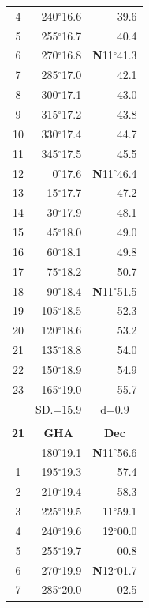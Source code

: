 \documentclass[10pt, a4paper]{report}
\begin{document}
\begin{scriptsize}
\begin{tabular*}{0.2\textwidth}[t]{@{\extracolsep{\fill}}|c|rr|}
4 & 240$^\circ$16.6 & 39.6\\
5 & 255$^\circ$16.7 & 40.4\\[2Pt]
6 & 270$^\circ$16.8 & \textbf{N}11$^\circ$41.3\\
7 & 285$^\circ$17.0 & 42.1\\
8 & 300$^\circ$17.1 & 43.0\\
9 & 315$^\circ$17.2 & \raisebox{0.24ex}{\boldmath$\cdot$~\boldmath$\cdot$~~}43.8\\
10 & 330$^\circ$17.4 & 44.7\\
11 & 345$^\circ$17.5 & 45.5\\[2Pt]
12 & 0$^\circ$17.6 & \textbf{N}11$^\circ$46.4\\
13 & 15$^\circ$17.7 & 47.2\\
14 & 30$^\circ$17.9 & 48.1\\
15 & 45$^\circ$18.0 & \raisebox{0.24ex}{\boldmath$\cdot$~\boldmath$\cdot$~~}49.0\\
16 & 60$^\circ$18.1 & 49.8\\
17 & 75$^\circ$18.2 & 50.7\\[2Pt]
18 & 90$^\circ$18.4 & \textbf{N}11$^\circ$51.5\\
19 & 105$^\circ$18.5 & 52.3\\
20 & 120$^\circ$18.6 & 53.2\\
21 & 135$^\circ$18.8 & \raisebox{0.24ex}{\boldmath$\cdot$~\boldmath$\cdot$~~}54.0\\
22 & 150$^\circ$18.9 & 54.9\\
23 & 165$^\circ$19.0 & 55.7\\
\hline
\rule{0pt}{2.4ex} & \multicolumn{1}{c}{SD.=15.9} & \multicolumn{1}{c|}{d=0.9}\\
\hline
\multicolumn{1}{c}{}\\[-0.5ex]\hline
\multicolumn{1}{|c|}{\rule{0pt}{2.6ex}\textbf{21}} & \multicolumn{1}{c}{\textbf{GHA}} & \multicolumn{1}{c|}{\textbf{Dec}}\\
\hline\rule{0pt}{2.6ex}\noindent
0 & 180$^\circ$19.1 & \textbf{N}11$^\circ$56.6\\
1 & 195$^\circ$19.3 & 57.4\\
2 & 210$^\circ$19.4 & 58.3\\
3 & 225$^\circ$19.5 & 11$^\circ$59.1\\
4 & 240$^\circ$19.6 & 12$^\circ$00.0\\
5 & 255$^\circ$19.7 & 00.8\\[2Pt]
6 & 270$^\circ$19.9 & \textbf{N}12$^\circ$01.7\\
7 & 285$^\circ$20.0 & 02.5\\

\end{tabular*}
\end{scriptsize}
\end{document}
